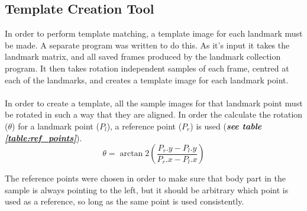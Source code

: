\documentclass[a4paper, 12pt]{article}
\begin{document}
	\subsection{Template Creation Tool}
	In order to perform template matching, a template image for each landmark must be made.
	A separate program was written to do this.
	As it's input it takes the landmark matrix, and all saved frames produced by the landmark collection program.
	It then takes rotation independent samples of each frame, centred at each of the landmarks, and creates
	a template image for each landmark point.
	\\\\
	In order to create a template, all the sample images for that landmark point must be rotated in such a way
	that they are aligned.
	In order the calculate the rotation ($\theta$) for a landmark point ($P_l$), a reference point ($P_r$) is used (\textbf{\emph{see table 			\ref{table:ref_points}}}).
	$$\theta = \arctan2(\frac{P_r.y - P_l.y}{{P_r.x - P_l.x}})$$
	\begin{table}[H]
	\centering
	\caption{Table showing the reference point used for each landmark point}
	\label{table:ref_points}
	\end{table}
	The reference points were chosen in order to make sure that body part in the sample is always pointing to the left, but
	it should be arbitrary which point is used as a reference, so long as the same point is used consistently.
	
\end{document}
